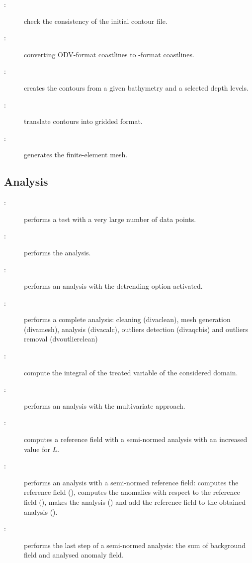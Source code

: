 \begin{description}
\item[:] check the consistency of the initial contour file.
\item[:] converting ODV-format coastlines to \diva-format coastlines.
\item[:] creates the contours from a given bathymetry and a selected depth levels.
\item[:] translate contours into gridded format.
\item[:] generates the finite-element mesh.
\end{description}

\subsection{Analysis}

\begin{description}
\item[:] performs a test with a very large number of data points.
\item[:] performs the \diva analysis.
\item[:] performs an analysis with the detrending option activated.
\item[:] performs a complete analysis: cleaning (divaclean), mesh generation (divamesh), analysis (divacalc), outliers detection (divaqcbis) and outliers removal (dvoutlierclean)
\item[:] compute the integral of the treated variable of the considered domain.
\item[:] performs an analysis with the multivariate approach.
\item[:] computes a reference field with a semi-normed analysis with an increased value for $L$.
\item[:] performs an analysis with a semi-normed reference field: computes the reference field (), computes the anomalies with respect to the reference field (), makes the analysis () and add the reference field to the obtained analysis ().
\item[:] performs the last step of a semi-normed analysis: the sum of background field and analysed anomaly field.
\end{description}

